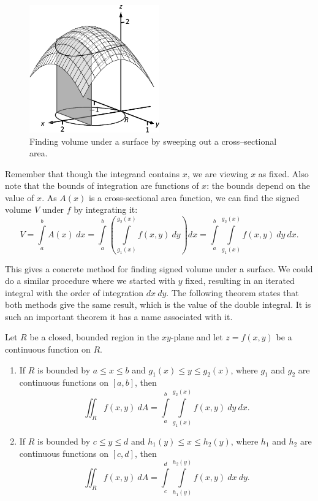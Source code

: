 \begin{figure}
	\begin{center}
			\includegraphics[width=0.5\textwidth]{fig_double_6}
	\caption{Finding volume under a surface by sweeping out a cross--sectional area.}
	\label{fig_double_6}
	\end{center}
\end{figure}

Remember that though the integrand contains $x$, we are viewing $x$ as fixed. Also note that the bounds of integration are functions of $x$: the bounds depend on the value of $x$. As $A(x)$ is a cross-sectional area function, we can find the signed volume $V$ under $f$ by integrating it:
$$V = \int\limits_a^b A(x)\ dx = \int\limits_a^b\left(\int\limits_{g_1(x)}^{g_2(x)} f(x,y)\ dy\right)dx = \int\limits_a^b\int\limits_{g_1(x)}^{g_2(x)} f(x,y)\ dy\ dx.$$

This gives a concrete method for finding signed volume under a surface. We could do a similar procedure where we started with $y$ fixed, resulting in an iterated integral with the order of integration $dx\ dy$. The following theorem states that both methods give the same result, which is the value of the double integral. It is such an important theorem it has a name associated with it.

\begin{theorem}\label{thm:fubini}
Let $R$ be a closed, bounded region in the $xy$-plane and let $z=f(x,y)$ be a continuous function on $R$.%
\begin{enumerate}
	\item If $R$ is bounded by $a\leq x\leq b$ and $g_1(x)\leq y\leq g_2(x)$, where $g_1$ and $g_2$ are continuous functions on $[a,b]$, then
	$$\iint_R f(x,y)\ dA = \int\limits_a^b\int\limits_{g_1(x)}^{g_2(x)} f(x,y)\ dy\ dx.$$
	
	\item If $R$ is bounded by $c\leq y\leq d$ and $h_1(y)\leq x\leq h_2(y)$, where $h_1$ and $h_2$ are continuous functions on $[c,d]$, then
	$$\iint_R f(x,y)\ dA = \int\limits_c^d\int\limits_{h_1(y)}^{h_2(y)} f(x,y)\ dx\ dy.$$
\end{enumerate}
\end{theorem}


